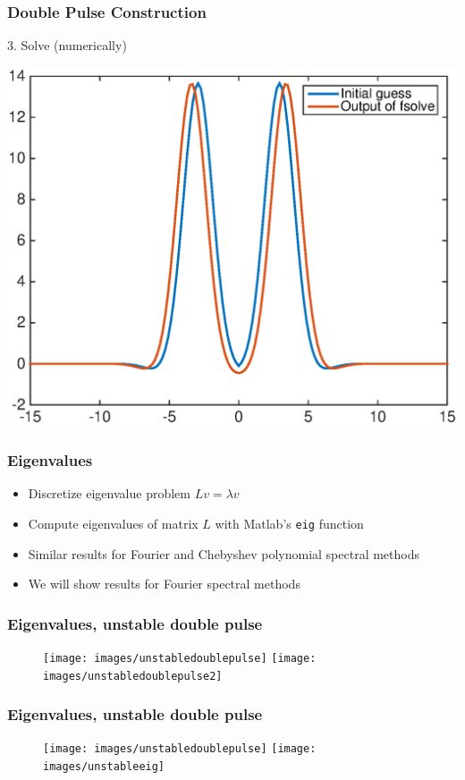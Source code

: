 \documentclass[16pt]{beamer}
\begin{document}
\begin{frame}
	\frametitle{Double Pulse Construction}
	3. Solve (numerically)
	\begin{center}
	\includegraphics[width=0.8\linewidth]{images/dp1after.eps}
	\end{center}
\end{frame}

\begin{frame}
	\frametitle{Eigenvalues}
	\begin{itemize}
		\item Discretize eigenvalue problem $Lv = \lambda v$
		\item Compute eigenvalues of matrix $L$ with Matlab's \texttt{eig} function
		\item Similar results for Fourier and Chebyshev polynomial spectral methods
		\item We will show results for Fourier spectral methods
	\end{itemize}
\end{frame}

\begin{frame}
	\frametitle{Eigenvalues, unstable double pulse}
	\begin{figure}
   		\texttt{[image: images/unstabledoublepulse]}
   		\hfill
   		\texttt{[image: images/unstabledoublepulse2]}
	\end{figure}
\end{frame}

\begin{frame}
	\frametitle{Eigenvalues, unstable double pulse}
	\begin{figure}
   		\texttt{[image: images/unstabledoublepulse]}
   		\hfill
   		\texttt{[image: images/unstableeig]}
	\end{figure}
\end{frame}
\end{document}
